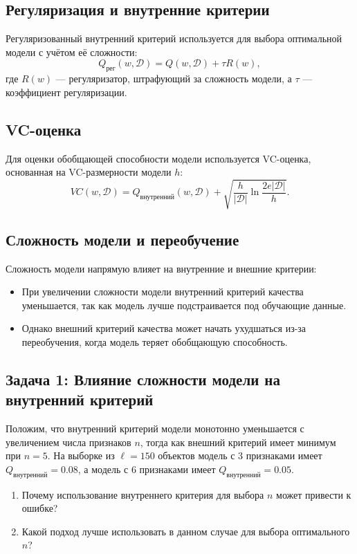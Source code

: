 \subsection*{Регуляризация и внутренние критерии}
Регуляризованный внутренний критерий используется для выбора оптимальной модели с учётом её сложности:
\[
Q_{\text{рег}}(w, \mathcal{D}) = Q(w, \mathcal{D}) + \tau R(w),
\]
где $R(w)$ --- регуляризатор, штрафующий за сложность модели, а $\tau$ --- коэффициент регуляризации.

\subsection*{VC-оценка}
Для оценки обобщающей способности модели используется VC-оценка, основанная на VC-размерности модели $h$:
\[
VC(w, \mathcal{D}) = Q_{\text{внутренний}}(w, \mathcal{D}) + \sqrt{\frac{h}{|\mathcal{D}|} \ln \frac{2e|\mathcal{D}|}{h}}.
\]

\subsection*{Сложность модели и переобучение}
Сложность модели напрямую влияет на внутренние и внешние критерии:
\begin{itemize}
    \item При увеличении сложности модели внутренний критерий качества уменьшается, так как модель лучше подстраивается под обучающие данные.
    \item Однако внешний критерий качества может начать ухудшаться из-за переобучения, когда модель теряет обобщающую способность.
\end{itemize}

\subsection*{Задача 1: Влияние сложности модели на внутренний критерий}

Положим, что внутренний критерий модели монотонно уменьшается с увеличением числа признаков $n$, тогда как внешний критерий имеет минимум при $n = 5$. На выборке из $\ell = 150$ объектов модель с 3 признаками имеет $Q_{\text{внутренний}} = 0.08$, а модель с 6 признаками имеет $Q_{\text{внутренний}} = 0.05$. 

\begin{enumerate}
    \item Почему использование внутреннего критерия для выбора $n$ может привести к ошибке?
    \item Какой подход лучше использовать в данном случае для выбора оптимального $n$?
\end{enumerate}

